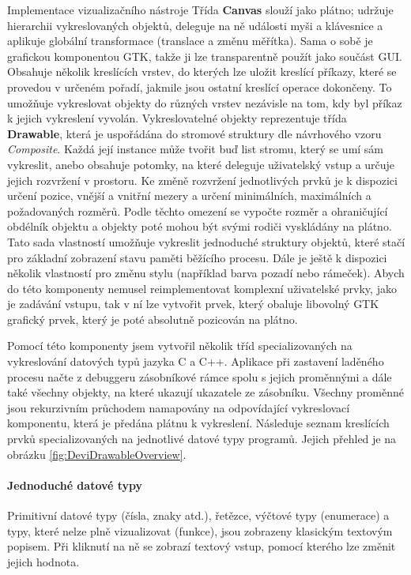 \documentclass[czech,bachelor,male,python,dept460]{diploma}						%
\newcommand{\parspace}[1][]{
	\ifthenelse{\isempty{#1}}{\vspace{5mm}}{\vspace{#1}}
	\par
}
\begin{document}
\begin{section}{Implementace vizualizačního nástroje}
	Třída \textbf{Canvas} slouží jako plátno; udržuje hierarchii vykreslovaných objektů, deleguje na ně události myši a klávesnice a aplikuje globální transformace
	(translace a změnu měřítka). Sama o sobě je grafickou komponentou GTK, takže ji lze transparentně použít jako součást GUI.
	Obsahuje několik kreslících vrstev, do kterých lze uložit kreslící příkazy, které se provedou v určeném pořadí, jakmile jsou ostatní kreslící operace dokončeny.
	To umožňuje vykreslovat objekty do různých vrstev nezávisle na tom, kdy byl příkaz k jejich vykreslení vyvolán.
	Vykreslovatelné objekty reprezentuje třída \textbf{Drawable}, která je uspořádána do stromové struktury dle návrhového vzoru
	\textit{Composite}\cite[183]{gof}. Každá její instance může tvořit buď list stromu, který se umí sám vykreslit, anebo obsahuje potomky, na které deleguje
	uživatelský vstup a určuje jejich rozvržení v prostoru. Ke změně rozvržení jednotlivých prvků je k dispozici určení pozice, vnější a vnitřní mezery
	a určení minimálních, maximálních a požadovaných rozměrů. Podle těchto omezení se vypočte rozměr a ohraničující obdélník objektu a objekty poté mohou být
	svými rodiči vyskládány na plátno.
	Tato sada vlastností umožňuje vykreslit jednoduché struktury objektů, které stačí pro základní zobrazení stavu paměti běžícího procesu.
	Dále je ještě k dispozici několik vlastností pro změnu stylu (například barva pozadí nebo rámeček). Abych do této komponenty
	nemusel reimplementovat komplexní uživatelské prvky, jako je zadávání vstupu, tak v ní lze vytvořit prvek, který obaluje libovolný GTK grafický prvek,
	který je poté absolutně pozicován na plátno.
	
	\parspace Pomocí této komponenty jsem vytvořil několik tříd specializovaných na vykreslování datových typů jazyka C a C++. Aplikace při zastavení laděného
	procesu načte z debuggeru zásobníkové rámce spolu s jejich proměnnými a dále také všechny objekty, na které ukazují ukazatele ze zásobníku.
	Všechny proměnné jsou rekurzivním průchodem namapovány na odpovídající vykreslovací komponentu, která je předána plátnu k vykreslení.
	Následuje seznam kreslících prvků specializovaných na jednotlivé datové typy programů. Jejich přehled je na obrázku \ref{fig:DeviDrawableOverview}.
	
	
	\paragraph*{Jednoduché datové typy} Primitivní datové typy (čísla, znaky atd.), řetězce, výčtové typy (enumerace) a typy, které nelze plně vizualizovat
	(funkce), jsou zobrazeny klasickým textovým popisem. Při kliknutí na ně se zobrazí textový vstup, pomocí kterého lze změnit jejich hodnota.

\end{section}
\end{document}
